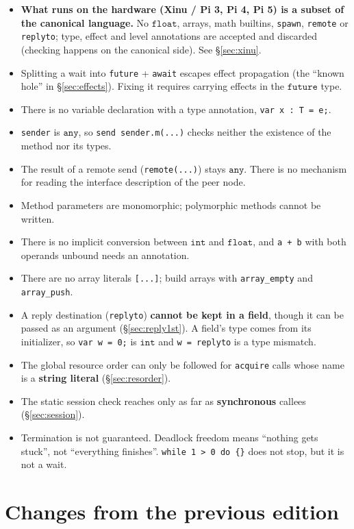 \documentclass[11pt,a4paper]{article}
\newcommand{\ty}[1]{\ensuremath{\mathtt{#1}}}
\begin{document}
\begin{itemize}
\item \textbf{What runs on the hardware (Xinu / Pi 3, Pi 4, Pi 5) is a subset of
  the canonical language.} No \ty{float}, arrays, math builtins, \texttt{spawn},
  \texttt{remote} or \texttt{replyto}; type, effect and level annotations are
  accepted and discarded (checking happens on the canonical side).
  See \S\ref{sec:xinu}.
\item Splitting a wait into \texttt{future} + \texttt{await} escapes effect
  propagation (the ``known hole'' in \S\ref{sec:effects}). Fixing it requires
  carrying effects in the \ty{future} type.
\item There is no variable declaration with a type annotation,
  \texttt{var x : T = e;}.
\item \texttt{sender} is \ty{any}, so \texttt{send sender.m(...)} checks
  neither the existence of the method nor its types.
\item The result of a remote send (\texttt{remote(...)}) stays \ty{any}. There
  is no mechanism for reading the interface description of the peer node.
\item Method parameters are monomorphic; polymorphic methods cannot be written.
\item There is no implicit conversion between \ty{int} and \ty{float}, and
  \texttt{a + b} with both operands unbound needs an annotation.
\item There are no array literals \texttt{[...]}; build arrays with
  \texttt{array\_empty} and \texttt{array\_push}.
\item A reply destination (\texttt{replyto}) \textbf{cannot be kept in a
  field}, though it can be passed as an argument (\S\ref{sec:reply1st}).
  A field's type comes from its initializer, so \texttt{var w = 0;} is \ty{int}
  and \texttt{w = replyto} is a type mismatch.
\item The global resource order can only be followed for \texttt{acquire} calls
  whose name is a \textbf{string literal} (\S\ref{sec:resorder}).
\item The static session check reaches only as far as \textbf{synchronous}
  callees (\S\ref{sec:session}).
\item Termination is not guaranteed. Deadlock freedom means ``nothing gets
  stuck'', not ``everything finishes''. \texttt{while 1 > 0 do \{\}} does not
  stop, but it is not a wait.
\end{itemize}

\section{Changes from the previous edition}
\end{document}
